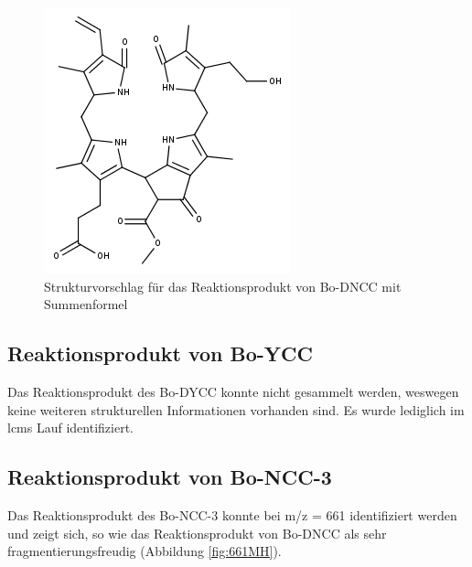 \begin{figure}[!htbp]
  \centering
  \includegraphics[scale=0.6]{figures/Kapitel7/Kataboliten/fragmentation_structures/VWA_Katabolit_633.png}
  \caption[LC-MS Chromatogramm vor der Reaktion, Quelle: Autor]{Strukturvorschlag für das Reaktionsprodukt von Bo-DNCC mit Summenformel \ch{}}
  \label{fig:633MStruktur}
\end{figure}

\subsection{Reaktionsprodukt von Bo-YCC}

Das Reaktionsprodukt des Bo-DYCC konnte nicht gesammelt werden, weswegen keine weiteren strukturellen Informationen vorhanden sind. Es wurde lediglich im \gls{lcms} Lauf identifiziert.

\subsection{Reaktionsprodukt von Bo-NCC-3}

Das Reaktionsprodukt des Bo-NCC-3 konnte bei m/z = 661 identifiziert werden und zeigt sich, so wie das Reaktionsprodukt von Bo-DNCC als sehr fragmentierungsfreudig (Abbildung \ref{fig:661MH}). 

